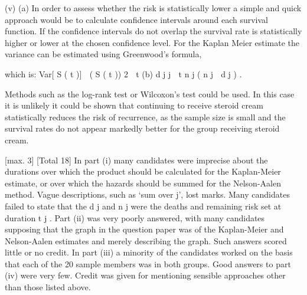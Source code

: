 \documentclass[a4paper,12pt]{article}
\begin{document}
(v)
(a)
In order to assess whether the risk is statistically lower a simple and quick approach would be to calculate confidence intervals around each survival function. 
If the confidence intervals do not overlap the survival rate is statistically higher or lower at the chosen confidence level. 
For the Kaplan Meier estimate the variance can be estimated using
Greenwood’s formula,

which is:
Var[ S ( t )]  ( S ( t )) 2  t
(b)
d j
j  t
n j ( n j  d j )
.

Methods such as the log-rank test or Wilcoxon’s test could
be used. 
In this case it is unlikely it could be shown that continuing to
receive steroid cream statistically reduces the risk of recurrence, 
as the sample size is small 
and the survival rates do not appear markedly better for the group
receiving steroid cream.

[max. 3]
[Total 18]
In part (i) many candidates were imprecise about the durations over
which the product should be calculated for the Kaplan-Meier estimate,
or over which the hazards should be summed for the Nelson-Aalen method. Vague descriptions, such as ‘sum over j’, lost marks. Many
candidates failed to state that the d j and n j were the deaths and
remaining risk set at duration t j . Part (ii) was very poorly answered,
with many candidates supposing that the graph in the question paper
was of the Kaplan-Meier and Nelson-Aalen estimates and merely describing the graph. Such answers scored little or no credit. In part
(iii) a minority of the candidates worked on the basis that each of the
20 sample members was in both groups. Good answers to part (iv)
were very few. Credit was given for mentioning sensible approaches
other than those listed above.
\end{document}
